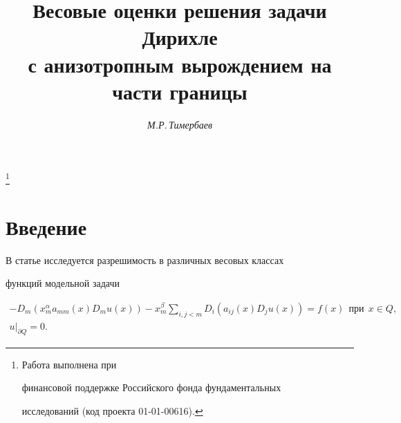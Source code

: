 




\author{\it М.Р.\,Тимербаев}




\title{Весовые оценки решения задачи Дирихле\\


с анизотропным вырождением на части границы}


\thanks{Работа выполнена при


финансовой поддержке Российского фонда фундаментальных


исследований (код проекта 01-01-00616).}





\date{}




\pagestyle{plain} %







\maketitle


\label{begin}








\section{Введение}





В статье исследуется разрешимость в различных весовых классах


функций модельной задачи


\begin{gather}\label{eq-1}


\displaystyle


-D_m(x_m^\alpha a_{mm}(x) D_m u(x))-x_m^\beta \sum\limits_{i,j <


m}D_i(a_{ij}(x) D_j u(x))=f(x) \ \ \text{при} \ \ x \in Q, \\


%


\displaystyle u|_{\partial Q}=0. \label{eq-2}


\end{gather}



